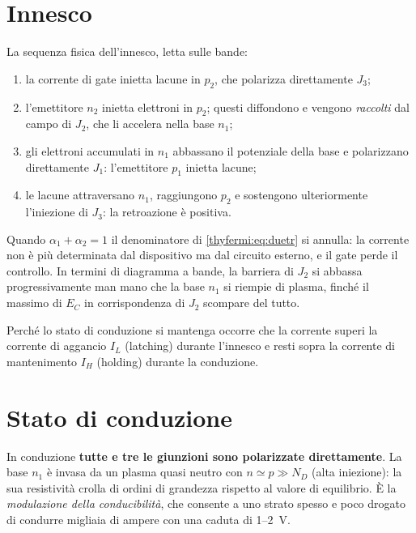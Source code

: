 \section{Innesco}

La sequenza fisica dell'innesco, letta sulle bande:
\begin{enumerate}\itemsep2pt
  \item la corrente di gate inietta lacune in $p_2$, che polarizza direttamente
        $J_3$;
  \item l'emettitore $n_2$ inietta elettroni in $p_2$; questi diffondono e vengono
        \emph{raccolti} dal campo di $J_2$, che li accelera nella base $n_1$;
  \item gli elettroni accumulati in $n_1$ abbassano il potenziale della base e
        polarizzano direttamente $J_1$: l'emettitore $p_1$ inietta lacune;
  \item le lacune attraversano $n_1$, raggiungono $p_2$ e sostengono
        ulteriormente l'iniezione di $J_3$: la retroazione è positiva.
\end{enumerate}
Quando $\alpha_1+\alpha_2=1$ il denominatore di \eqref{thyfermi:eq:duetr} si annulla: la
corrente non è più determinata dal dispositivo ma dal circuito esterno, e il gate
perde il controllo. In termini di diagramma a bande, la barriera di $J_2$ si
abbassa progressivamente man mano che la base $n_1$ si riempie di plasma, finché
il massimo di $E_C$ in corrispondenza di $J_2$ scompare del tutto.

Perché lo stato di conduzione si mantenga occorre che la corrente superi la
corrente di aggancio $I_L$ (latching) durante l'innesco e resti sopra la corrente
di mantenimento $I_H$ (holding) durante la conduzione.

\section{Stato di conduzione}

In conduzione \textbf{tutte e tre le giunzioni sono polarizzate direttamente}.
La base $n_1$ è invasa da un plasma quasi neutro con $n \simeq p \gg N_D$
(alta iniezione): la sua resistività crolla di ordini di grandezza rispetto al
valore di equilibrio. È la \emph{modulazione della conducibilità}, che consente a
uno strato spesso e poco drogato di condurre migliaia di ampere con una caduta di
1--2~V.

